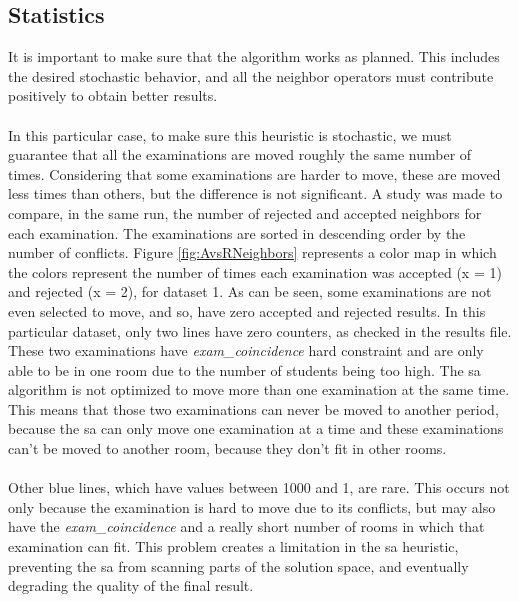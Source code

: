 \subsection{Statistics}
\label{sub:SAStatistics}
It is important to make sure that the algorithm works as planned. This includes the desired stochastic behavior, and all the neighbor operators must contribute positively to obtain better results.\\
\\
In this particular case, to make sure this heuristic is stochastic, we must guarantee that all the examinations are moved roughly the same number of times. Considering that some examinations are harder to move, these are moved less times than others, but the difference is not significant. A study was made to compare, in the same run, the number of rejected and accepted neighbors for each examination. The examinations are sorted in descending order by the number of conflicts. Figure \ref{fig:AvsRNeighbors} represents a color map in which the colors represent the number of times each examination was accepted (x = 1) and rejected (x = 2), for dataset 1. As can be seen, some examinations are not even selected to move, and so, have zero accepted and rejected results. In this particular dataset, only two lines have zero counters, as checked in the results file. These two examinations have \textit{exam\_coincidence} hard constraint and are only able to be in one room due to the number of students being too high. The \gls{sa} algorithm is not optimized to move more than one examination at the same time. This means that those two examinations can never be moved to another period, because the \gls{sa} can only move one examination at a time and these examinations can't be moved to another room, because they don't fit in other rooms.\\
\\
Other blue lines, which have values between 1000 and 1, are rare. This occurs not only because the examination is hard to move due to its conflicts, but may also have the \textit{exam\_coincidence} and a really short number of rooms in which that examination can fit. This problem creates a limitation in the \gls{sa} heuristic, preventing the \gls{sa} from scanning parts of the solution space, and eventually degrading the quality of the final result.\\
\\
